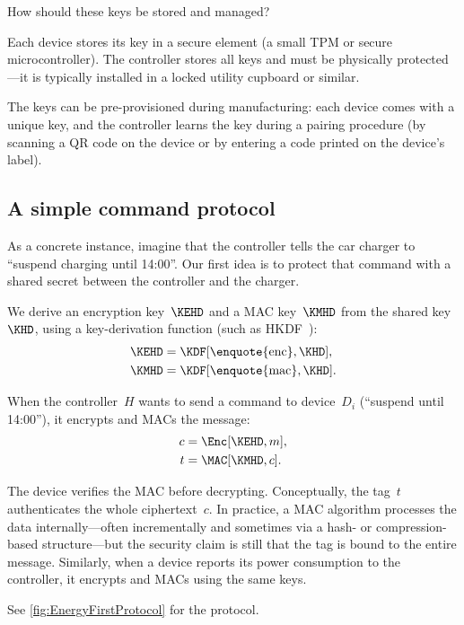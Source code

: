 \begin{exercise}
  How should these keys be stored and managed?
\end{exercise}

Each device stores its key in a secure element (\eg a small \ac{TPM} or
secure microcontroller).
The controller stores all keys and must be physically protected---it is
typically installed in a locked utility cupboard or similar.

The keys can be pre-provisioned during manufacturing: each device comes with
a unique key, and the controller learns the key during a pairing procedure
(\eg by scanning a QR code on the device or by entering a code printed on
the device's label).

\subsection{A simple command protocol}

As a concrete instance, imagine that the controller tells the car charger to
\enquote{suspend charging until 14:00}.
Our first idea is to protect that command with a shared secret between the
controller and the charger.

We derive an encryption key~\(\KEHD\) and a MAC key~\(\KMHD\) from the
shared key~\(\KHD\), using a key-derivation function (such as
HKDF~\autocite{HKDF}):
\begin{align*}
  \KEHD &= \KDF[\text{\enquote{enc}}, \KHD], \\
  \KMHD &= \KDF[\text{\enquote{mac}}, \KHD].
\end{align*}

When the controller~\(H\) wants to send a command to device~\(D_i\)
(\eg \enquote{suspend until 14:00}), it encrypts and MACs the message:
\begin{align*}
  c &= \Enc[\KEHD, m], \\
  t &= \MAC[\KMHD, c].
\end{align*}

The device verifies the MAC before decrypting.
Conceptually, the tag~\(t\) authenticates the whole ciphertext~\(c\).
In practice, a MAC algorithm processes the data internally---often
incrementally and sometimes via a hash- or compression-based structure---but
the security claim is still that the tag is bound to the entire message.
Similarly, when a device reports its power consumption to the controller, it
encrypts and MACs using the same keys.

See \cref{fig:EnergyFirstProtocol} for the protocol.

